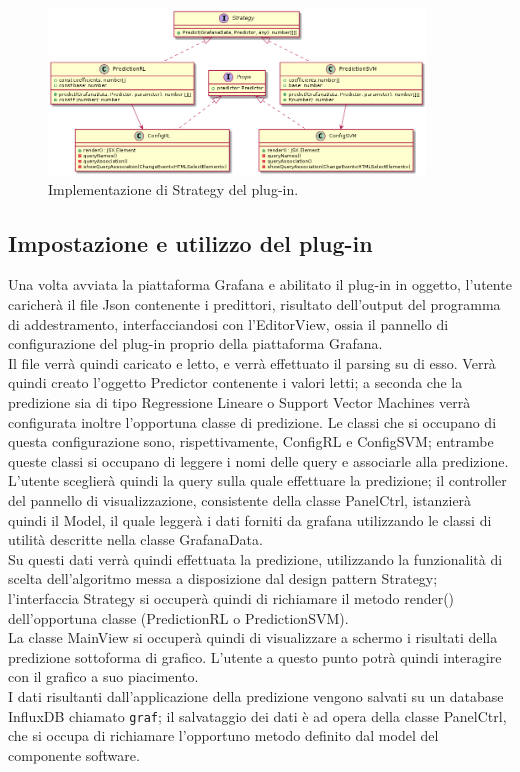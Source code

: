 \documentclass[../manuale-sviluppatore.tex]{subfiles}
\begin{document}
\begin{figure}[H]
  \centering
  \includegraphics[width=10cm]{img/plugin/strategy.png}
  \caption{Implementazione di Strategy del plug-in.}
\end{figure}


\subsection{Impostazione e utilizzo del plug-in}
Una volta avviata la piattaforma Grafana e abilitato il plug-in in oggetto, l'utente caricherà il file Json contenente i predittori, risultato dell'output del programma di addestramento, interfacciandosi con l'EditorView, ossia il pannello di configurazione del plug-in proprio della piattaforma Grafana. \\
Il file verrà quindi caricato e letto, e verrà effettuato il parsing su di esso. Verrà quindi creato l'oggetto Predictor contenente i valori letti; a seconda che la predizione sia di tipo Regressione Lineare o Support Vector Machines verrà configurata inoltre l'opportuna classe di predizione. Le classi che si occupano di questa configurazione sono, rispettivamente, ConfigRL e ConfigSVM; entrambe queste classi si occupano di leggere i nomi delle query e associarle alla predizione. \\
L'utente sceglierà quindi la query sulla quale effettuare la predizione; il controller del pannello di visualizzazione, consistente della classe PanelCtrl, istanzierà quindi il Model, il quale leggerà i dati forniti da grafana utilizzando le classi di utilità descritte nella classe GrafanaData. \\
Su questi dati verrà quindi effettuata la predizione, utilizzando la funzionalità di scelta dell'algoritmo messa a disposizione dal design pattern Strategy; l'interfaccia Strategy si occuperà quindi di richiamare il metodo render() dell'opportuna classe (PredictionRL o PredictionSVM). \\
La classe MainView si occuperà quindi di visualizzare a schermo i risultati della predizione sottoforma di grafico. L'utente a questo punto potrà quindi interagire con il grafico a suo piacimento. \\
I dati risultanti dall'applicazione della predizione vengono salvati su un database InfluxDB chiamato \texttt{graf}; il salvataggio dei dati è ad opera della classe PanelCtrl, che si occupa di richiamare l'opportuno metodo definito dal model del componente software.
\end{document}
